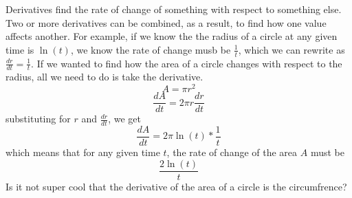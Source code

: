 \documentclass[../revisedmain.tex]{subfiles}
\begin{document}
	Derivatives find the rate of change of something with respect to something else. Two or more derivatives can be combined, as a result, to find how one value affects another. For example, if we know the the radius of a circle at any given time is $\ln(t)$, we know the rate of change musb be $\displaystyle\frac{1}{t}$, which we can rewrite as $\displaystyle\frac{dr}{dt}=\displaystyle\frac{1}{t}$. If we wanted to find how the area of a circle changes with respect to the radius, all we need to do is take the derivative. $$A=\pi r^2$$$$\frac{dA}{dt}=2\pi r\frac{dr}{dt}$$ substituting for $r$ and $\displaystyle\frac{dr}{dt}$, we get $$\frac{dA}{dt}=2 \pi \ln(t) * \frac{1}{t}$$ which means that for any given time $t$, the rate of change of the area $A$ must be $$\frac{2\ln(t)}{t}$$ Is it not super cool that the derivative of the area of a circle is the circumfrence?
\end{document}

